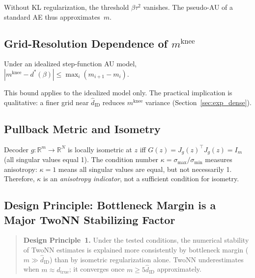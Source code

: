 \documentclass[make,article,submit,pdftex,moreauthors]{Definitions/mdpi}
\newcommand{\Jg}{J_g}
\newcommand{\kap}{\kappa}
\newcommand{\mknee}{m^{\mathrm{knee}}}
\newcommand{\hatdID}{\hat{d}_{\mathrm{ID}}}
\newcommand{\R}{\mathbb{R}}
\begin{document}
\begin{Remark}[Vanilla AE corresponds to $\beta = 0$]
Without KL regularization, the threshold $\beta\tau^2$ vanishes.
The pseudo-AU of a standard AE thus approximates~$m$.
\end{Remark}

\subsection{Grid-Resolution Dependence of $\mknee$}

\begin{Proposition}\label{thm:mknee_instab}
Under an idealized step-function AU model,
$|\mknee - d^*(\beta)| \leq \max_i(m_{i+1} - m_i)$.
\end{Proposition}

\begin{Remark}
This bound applies to the idealized model only.
The practical implication is qualitative: a finer grid near $\hatdID$
reduces $\mknee$ variance (Section~\ref{sec:exp_dense}).
\end{Remark}

\subsection{Pullback Metric and Isometry}

\begin{Proposition}\label{prop:pullback}
Decoder $g:\R^m \to \R^N$ is locally isometric at $z$ iff
$G(z) = \Jg(z)^\top \Jg(z) = I_m$ (all singular values equal 1).
The condition number $\kap = \sigma_{\max} / \sigma_{\min}$ measures
anisotropy: $\kap = 1$ means all singular values are equal, but not
necessarily 1.
Therefore, $\kap$ is an \emph{anisotropy indicator}, not a sufficient
condition for isometry.
\end{Proposition}

\subsection{\texorpdfstring{Design Principle:
Bottleneck Margin is a Major TwoNN Stabilizing Factor}
{Design Principle: Bottleneck Margin}}

\label{sec:dp}

\begin{quote}
\textbf{Design Principle~1.}
Under the tested conditions, the numerical stability of TwoNN estimates
is explained more consistently by bottleneck margin ($m \gg \hatdID$) than
by isometric regularization alone.
TwoNN underestimates when $m \approx d_{\mathrm{true}}$; it converges once
$m \geq 5\hatdID$ approximately.
\end{quote}
\end{document}
